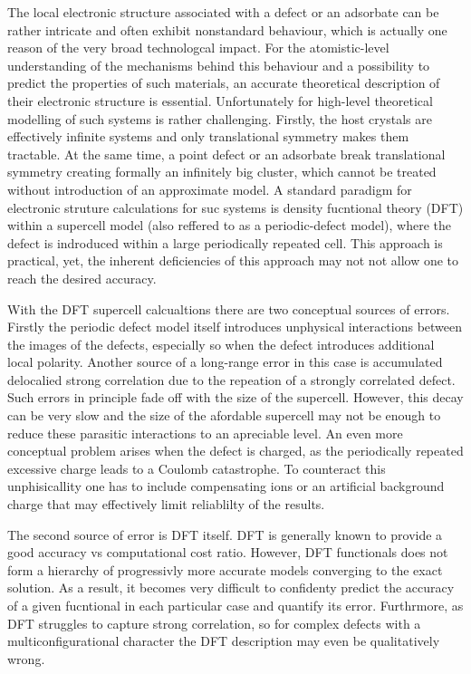 \documentclass[a4paper,11pt,headings=normal]{scrartcl}
\begin{document}
The local electronic structure associated with a defect or an adsorbate can be rather intricate and often exhibit nonstandard behaviour, which is actually one reason of the very broad technologcal impact. For the atomistic-level understanding of the mechanisms behind this behaviour and a possibility to predict the properties of such materials, an accurate theoretical description of their electronic structure is essential. Unfortunately for high-level theoretical modelling of such systems is rather challenging. Firstly, the host crystals are effectively infinite systems and only translational symmetry makes them tractable. At the same time, a point defect or an adsorbate break translational symmetry creating formally an infinitely big cluster, which cannot be treated without introduction of an approximate model. A standard paradigm for electronic struture calculations for suc systems is density fucntional theory (DFT) within a supercell model (also reffered to as a periodic-defect model), where the defect is indroduced within a large periodically repeated cell. This approach is practical, yet, the inherent deficiencies of this approach may not not allow one to reach the desired accuracy. 

With the DFT supercell calcualtions there are two conceptual sources of errors. Firstly the periodic defect model itself introduces unphysical interactions between the images of the defects, especially so when the defect introduces additional local polarity. Another source of a long-range error in this case is accumulated delocalied strong correlation due to the repeation of a strongly correlated  defect. Such errors in principle fade off with the size of the supercell. However, this decay can be very slow and the size of the afordable supercell may not be enough to reduce these parasitic interactions to an apreciable level. An even more conceptual problem arises when the defect is charged, as the periodically repeated excessive charge leads to a Coulomb catastrophe. To counteract this unphisicallity one has to include compensating ions or an artificial background charge that may effectively limit reliablilty of the results.

The second source of error is DFT itself. DFT is generally known to provide a good accuracy vs computational cost ratio. However, DFT functionals does not form a hierarchy of progressivly more accurate models converging to the exact solution. As a result, it becomes very difficult to confidenty predict the accuracy of a given fucntional in each particular case and quantify its error. Furthrmore, as DFT struggles to capture strong correlation, so for complex defects with a multiconfigurational character the DFT description may even be qualitatively wrong.
\end{document}
